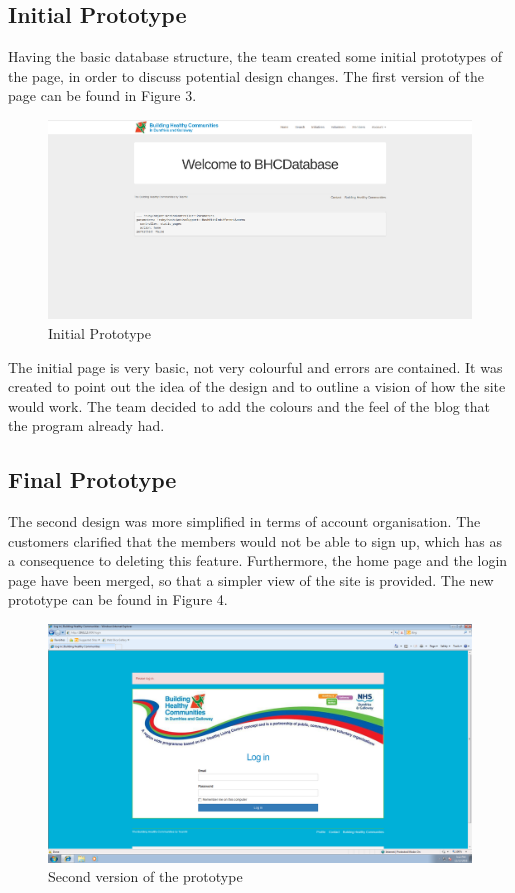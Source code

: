 \documentclass{l3proj}
\begin{document}
\subsection{Initial Prototype}
\label{sec:prototype1}

Having the basic database structure, the team created some initial prototypes of the page, in order to discuss potential design changes. The first version of the page can be found in Figure 3.

\begin{figure}
  \centerline{\includegraphics[width=\textwidth, height=\textheight, keepaspectratio]{oldhome.png}}
  \caption{Initial Prototype}
\end{figure}

The initial page is very basic, not very colourful and errors are contained. It was created to point out the idea of the  design and to outline a vision of how the site would work. The team decided to add the colours and the feel of the blog that the program already had.

\subsection{Final Prototype}
\label{sec:prototype2} 

The second design was more simplified in terms of account organisation. The customers clarified that the members would not be able to sign up, which has as a consequence to deleting this feature. Furthermore, the home page and the login page have been merged, so that a simpler view of the site is provided. The new prototype can be found in Figure 4.

\begin{figure}
  \centerline{\includegraphics[width=\textwidth, height=\textheight, keepaspectratio]{newhome.png}}
  \caption{Second version of the prototype}
\end{figure}
\end{document}
